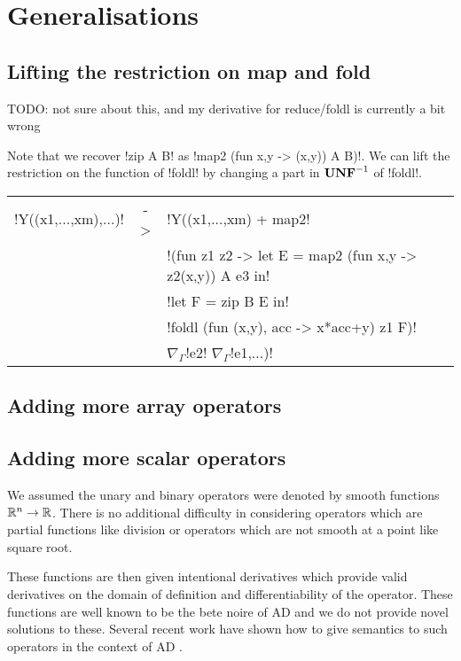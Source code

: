 \section{Generalisations}
\label{sec:generalisation}


\subsection{Lifting the restriction on map and fold}
\label{sub:Lifting the restriction on map and fold}

TODO: not sure about this, and my derivative for reduce/foldl is currently a bit wrong

Note that we recover !zip A B! as !map2 (fun x,y -> (x,y)) A B)!. 
We can lift the restriction on the function of !foldl! by changing a part in $\mathbf{UNF}^{-1}$ of !foldl!.
\begin{center}
\begin{tabular}{r c l}
    !Y((x1,...,xm),...)! & -> &  !Y((x1,...,xm) + map2! \\
        && !(fun z1 z2 -> let E = map2 (fun x,y -> z2(x,y)) A e3 in! \\
        &&  !let F = zip B E in!\\
        && !foldl (fun (x,y), acc  -> x*acc+y) z1 F)! \\
        && $\nabla_{\Gamma}$!e2! $\nabla_{\Gamma}$!e1,...)!
\end{tabular}
\end{center}

\subsection{Adding more array operators}
\label{sub:Adding more array operators}


\subsection{Adding more scalar operators} %
\label{sub:Adding more scalar operators}

We assumed the unary and binary operators were denoted by smooth functions $\mathbb{R}^n\to\mathbb{R}$. 
There is no additional difficulty in considering operators which are partial functions 
like division or operators which are not smooth at a point like square root.

These functions are then given intentional derivatives which provide valid derivatives 
on the domain of definition and differentiability of the operator. 
These functions are well known to be the bete noire of AD \cite{griewank2008evaluating} 
and we do not provide novel solutions to these.  
Several recent work have shown how to give semantics to such operators in the context of AD \cite{vakar2020denotational,mazza2021automatic,sherman2021,lee2020correctness}.

